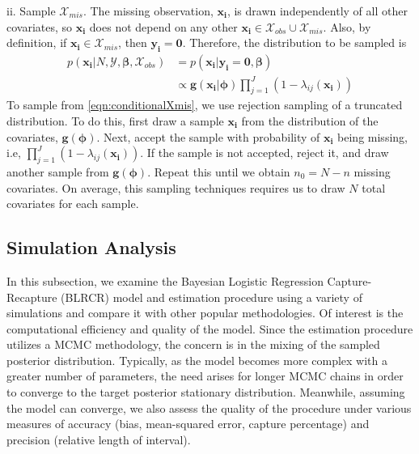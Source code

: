 \documentclass[
  12pt,
]{article}
\begin{document}
\begin{list}{}{}
\begin{list}{}{}
  
  \item[ii.] Sample $\mathcal{X}_{mis}$.   The missing observation, $\boldsymbol{x_i}$, is drawn independently of all other covariates, so $\boldsymbol{x_i}$ does not depend on any other $\boldsymbol{x_i} \in \mathcal{X}_{obs}\cup \mathcal{X}_{mis} $.  Also, by definition, if $\boldsymbol{x_i} \in \mathcal{X}_{mis}$, then $\boldsymbol{y_i} = \boldsymbol{0}$. Therefore, the distribution to be sampled is
  \begin{align}
  \label{eqn:conditionalXmis}
  \nonumber p(\boldsymbol{x_i}|N,\mathcal{Y},\boldsymbol{\beta},\mathcal{X}_{obs})&=p(\boldsymbol{x_i} |\boldsymbol{y_i}=\boldsymbol{0},\boldsymbol{\beta})\\
  &\propto \boldsymbol{g}(\boldsymbol{x_i}|\boldsymbol{\phi})\prod_{j=1}^J (1-\lambda_{ij}(\boldsymbol{x_i}))
  \end{align}
To sample from \autoref{eqn:conditionalXmis}, we use rejection sampling of a truncated distribution.  To do this, first draw a sample $\boldsymbol{x_i}$ from the distribution of the covariates, $\boldsymbol{g}(\boldsymbol{\phi})$. Next, accept the sample with probability of $\boldsymbol{x_i}$ being missing, i.e, $\prod_{j=1}^J (1-\lambda_{ij}(\boldsymbol{x_i}))$.  If the sample is not accepted, reject it, and draw another sample from $\boldsymbol{g}(\boldsymbol{\phi})$. Repeat this until we obtain $n_0 = N - n$ missing covariates.  On average, this sampling techniques requires us to draw $N$ total covariates for each sample.
  
  \end{list}
  
  

\end{list}

\subsection{Simulation Analysis}
\label{sec:simulationanalysis}

In this subsection, we examine the Bayesian Logistic Regression
Capture-Recapture (BLRCR) model and estimation procedure using a variety
of simulations and compare it with other popular methodologies. Of
interest is the computational efficiency and quality of the model. Since
the estimation procedure utilizes a MCMC methodology, the concern is in
the mixing of the sampled posterior distribution. Typically, as the
model becomes more complex with a greater number of parameters, the need
arises for longer MCMC chains in order to converge to the target
posterior stationary distribution. Meanwhile, assuming the model can
converge, we also assess the quality of the procedure under various
measures of accuracy (bias, mean-squared error, capture percentage) and
precision (relative length of interval).
\end{document}
